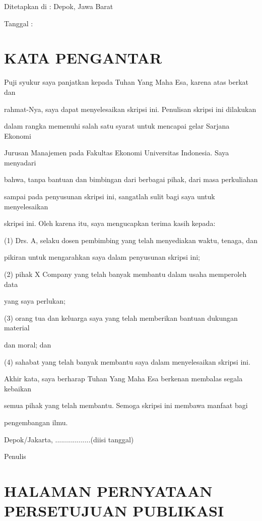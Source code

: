 \documentclass[
]{article}
\begin{document}
Ditetapkan di : Depok, Jawa Barat

Tanggal :

\hypertarget{kata-pengantar}{%
\section{KATA PENGANTAR}\label{kata-pengantar}}

Puji syukur saya panjatkan kepada Tuhan Yang Maha Esa, karena atas
berkat dan

rahmat-Nya, saya dapat menyelesaikan skripsi ini. Penulisan skripsi ini
dilakukan

dalam rangka memenuhi salah satu syarat untuk mencapai gelar Sarjana
Ekonomi

Jurusan Manajemen pada Fakultas Ekonomi Universitas Indonesia. Saya
menyadari

bahwa, tanpa bantuan dan bimbingan dari berbagai pihak, dari masa
perkuliahan

sampai pada penyusunan skripsi ini, sangatlah sulit bagi saya untuk
menyelesaikan

skripsi ini. Oleh karena itu, saya mengucapkan terima kasih kepada:

(1) Drs. A, selaku dosen pembimbing yang telah menyediakan waktu,
tenaga, dan

pikiran untuk mengarahkan saya dalam penyusunan skripsi ini;

(2) pihak X Company yang telah banyak membantu dalam usaha memperoleh
data

yang saya perlukan;

(3) orang tua dan keluarga saya yang telah memberikan bantuan dukungan
material

dan moral; dan

(4) sahabat yang telah banyak membantu saya dalam menyelesaikan skripsi
ini.

Akhir kata, saya berharap Tuhan Yang Maha Esa berkenan membalas segala
kebaikan

semua pihak yang telah membantu. Semoga skripsi ini membawa manfaat bagi

pengembangan ilmu.

Depok/Jakarta, ..................(diisi tanggal)

Penulis

\hypertarget{halaman-pernyataan-persetujuan-publikasi}{%
\section{HALAMAN PERNYATAAN PERSETUJUAN
PUBLIKASI}\label{halaman-pernyataan-persetujuan-publikasi}}
\end{document}
